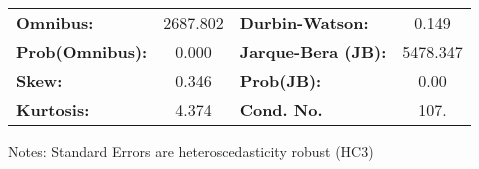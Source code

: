 \begin{center}
\begin{tabular}{lcccccc}
\bottomrule
\end{tabular}
\begin{tabular}{lclc}
\textbf{Omnibus:}       & 2687.802 & \textbf{  Durbin-Watson:     } &    0.149  \\
\textbf{Prob(Omnibus):} &   0.000  & \textbf{  Jarque-Bera (JB):  } & 5478.347  \\
\textbf{Skew:}          &   0.346  & \textbf{  Prob(JB):          } &     0.00  \\
\textbf{Kurtosis:}      &   4.374  & \textbf{  Cond. No.          } &     107.  \\
\bottomrule
\end{tabular}
\end{center}

Notes: \newline
 [1] Standard Errors are heteroscedasticity robust (HC3)